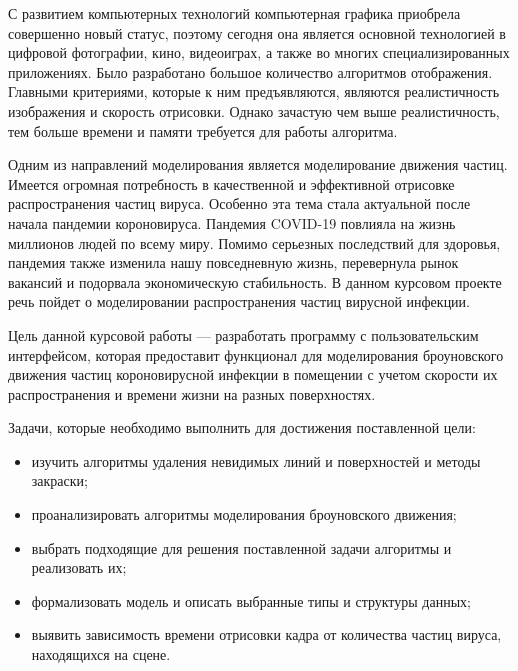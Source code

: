 \Introduction

С развитием компьютерных технологий компьютерная графика приобрела совершенно новый статус, поэтому сегодня она является основной технологией в цифровой фотографии, кино, видеоиграх, а также во многих специализированных приложениях. Было разработано большое количество алгоритмов отображения. Главными критериями, которые к ним предъявляются, являются реалистичность изображения и скорость отрисовки. Однако зачастую чем выше реалистичность, тем больше времени и памяти требуется для работы алгоритма.

Одним из направлений моделирования является моделирование движения частиц. Имеется огромная потребность в качественной и эффективной отрисовке распространения частиц вируса. Особенно эта тема стала актуальной после начала пандемии короновируса. Пандемия COVID-19 повлияла на жизнь миллионов людей по всему миру. Помимо серьезных последствий для здоровья, пандемия также изменила нашу повседневную жизнь, перевернула рынок вакансий и подорвала экономическую стабильность. В данном курсовом проекте речь пойдет о моделировании распространения частиц вирусной инфекции.

Цель данной курсовой работы --- разработать программу с пользовательским интерфейсом, которая предоставит функционал для моделирования броуновского движения частиц короновирусной инфекции в помещении с учетом скорости их распространения и времени жизни на разных поверхностях.

Задачи, которые необходимо выполнить для достижения поставленной цели:

\begin{itemize}
	\item изучить алгоритмы удаления невидимых линий и поверхностей и методы закраски;
	\item проанализировать алгоритмы моделирования броуновского движения;
	\item выбрать подходящие для решения поставленной задачи алгоритмы и реализовать их;
	\item формализовать модель и описать выбранные типы и структуры данных;
	\item выявить зависимость времени отрисовки кадра от количества частиц вируса, находящихся на сцене.
\end{itemize}